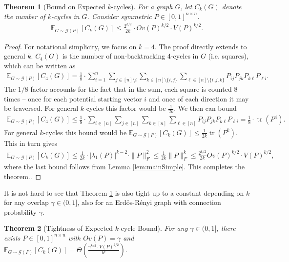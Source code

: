 \documentclass{article}
\newtheorem{theorem}{Theorem}
\newcommand{\norm}[1]{\|#1\|}
\newcommand{\E}{\mathbb{E}}
\DeclareMathOperator{\tr}{tr}
\begin{document}
\begin{theorem}[Bound on Expected $k$-cycles]\label{thm:k}
For a graph $G$, let $C_k(G)$ denote the number of $k$-cycles in $G$. Consider symmetric $P \in [0,1]^{n \times n}$. 
\begin{align*}
\E_{G \sim \mathcal{G}(P)} \left [C_k(G) \right ] \le \frac{2^{k/2}}{2k} \cdot Ov(P)^{k/2} \cdot V(P)^{k/2}.
\end{align*}
\end{theorem}
\begin{proof}
For notational simplicity, we focus on $k = 4$. The proof directly extends to general $k$. $C_4(G)$ is the number of non-backtracking 4-cycles in $G$ (i.e. squares), which can be written as
\begin{align*}
\E_{G \sim \mathcal{G}(P)} \left [C_4(G) \right ] = \frac{1}{8} \cdot \sum_{i =1}^n \sum_{j \in [n] \setminus i} \sum_{k \in [n]\setminus\{i,j\}} \sum_{\ell \in [n]\setminus \{i,j,k\}} P_{ij} P_{jk} P_{k \ell} P_{\ell i}.
\end{align*}
 The $1/8$ factor accounts for the fact that in the sum, each square is counted $8$ times -- once for each potential starting vector $i$ and once of each direction it may be traversed. For general $k$-cycles this factor would be $\frac{1}{2k}$. We then can bound
\begin{align*}
\E_{G \sim \mathcal{G}(P)} \left [C_4(G) \right ]  \le \frac{1}{8} \cdot\sum_{i \in [n]} \sum_{j \in [n]} \sum_{k \in [n]} \sum_{\ell \in [n]} P_{ij} P_{jk} P_{k \ell} P_{\ell i} = \frac{1}{8} \cdot \tr(P^4).
\end{align*}
For general $k$-cycles this bound would be $\E_{G \sim \mathcal{G}(P)} \left [C_k(G) \right ] \le \frac{1}{2k} \tr(P^k).$
This in turn gives
\begin{align*}
\E_{G \sim \mathcal{G}(P)} \left [C_k(G) \right ] \le \frac{1}{2k} \cdot |\lambda_1(P)|^{k-2} \cdot \norm{P}_F^{2} \le \frac{1}{2k} \norm{P}_F^k \le \frac{2^{k/2}}{2k} Ov(P)^{k/2} \cdot V(P)^{k/2},
\end{align*}
where the last bound follows from Lemma \ref{lem:mainSimple}.
This completes the theorem..
\end{proof}
It is not hard to see that Theorem \ref{thm:k} is also tight up to a constant depending on $k$ for any overlap $\gamma \in (0,1]$, also for an Erd\"{o}s-R\'{e}nyi graph with connection probability $\gamma$. 
\begin{theorem}[Tightness of Expected $k$-cycle Bound]\label{thm:tightK}
For any $\gamma \in (0,1]$, there exists $P \in [0,1]^{n \times n}$ with $Ov(P) = \gamma$ and $\E_{G \sim \mathcal{G}(P)} [C_k(G)] = \Theta \left ( \frac{\gamma^{k/2} \cdot V(P)^{k/2}}{k!} \right)$.
 \end{theorem}
\end{document}
